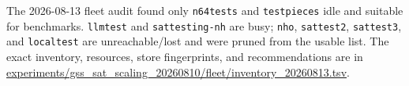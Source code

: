 \documentclass[11pt]{article}
\newcommand{\code}[1]{\texttt{#1}}
\begin{document}
The 2026-08-13 fleet audit found only \code{n64tests} and \code{testpieces}
idle and suitable for benchmarks.  \code{llmtest} and \code{sattesting-nh}
are busy; \code{nho}, \code{sattest2}, \code{sattest3}, and
\code{localtest} are unreachable/lost and were pruned from the usable list.
The exact inventory, resources, store fingerprints, and recommendations are in
\url{experiments/gss_sat_scaling_20260810/fleet/inventory_20260813.tsv}.
\end{document}
